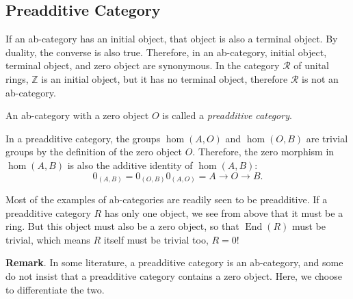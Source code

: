 \documentclass[12pt]{article}
\begin{document}
\subsection{Preadditive Category}
If an ab-category has an initial object, that object is also a terminal object.  By duality, the converse is also true.  Therefore, in an ab-category, initial object, terminal object, and zero object are synonymous.  In the category $\mathcal{R}$ of unital rings, $\mathbb{Z}$ is an initial object, but it has no terminal object, therefore $\mathcal{R}$ is not an ab-category.

An ab-category with a zero object $O$ is called a \emph{preadditive category}.

In a preadditive category, the groups $\hom(A,O)$ and $\hom(O,B)$ are trivial groups by the definition of the zero object $O$.  Therefore, the zero morphism in $\hom(A,B)$ is also the additive identity of $\hom(A,B)$:
$$0_{(A,B)}=0_{(O,B)}0_{(A,O)}=A\longrightarrow O\longrightarrow B.$$

Most of the examples of ab-categories are readily seen to be preadditive.  If a preadditive category $R$ has only one object, we see from above that it must be a ring.  But this object must also be a zero object, so that $\operatorname{End}(R)$ must be trivial, which means $R$ itself must be trivial too, $R=0$!

\textbf{Remark}.  In some literature, a preadditive category is an ab-category, and some do not insist that a preadditive category contains a zero object.  Here, we choose to differentiate the two.
\end{document}
